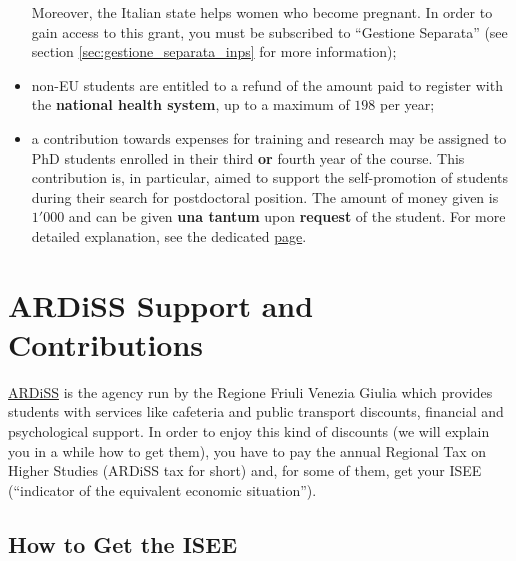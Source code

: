 \documentclass{sissavademecum}
\begin{document}
\begin{itemize}
    Moreover, the Italian state helps women who become pregnant. In order to gain access to this grant, you must be subscribed to ``Gestione Separata'' (see section \ref{sec:gestione_separata_inps} for more information);
    \item non-EU students are entitled to a refund of the amount paid to register with the \textbf{national health system}, up to a maximum of \EUR{} $198$ per year;
    \item a contribution towards expenses for training and research may be assigned to PhD students enrolled in their third \textbf{or} fourth year of the course. This contribution is, in particular, aimed to support the self-promotion of students during their search for postdoctoral position. The amount of money given is \EUR{} $1'000$ and can be given \textbf{una tantum} upon \textbf{request} of the student. For more detailed explanation, see the dedicated \href{https://wiki.sissa.it/students/index.php/Training_and_research_contribution}{page}.
\end{itemize}


\chapter{ARDiSS Support and Contributions}
\label{sec:ARDiSS}


\href{http://www.ardiss.fvg.it}{ARDiSS} is the agency run by the Regione Friuli Venezia Giulia which provides students with services like cafeteria and public transport discounts, financial and psychological support. In order to enjoy this kind of discounts (we will explain you in a while how to get them), you have to pay the annual Regional Tax on Higher Studies (ARDiSS tax for short) and, for some of them, get your ISEE (``indicator of the equivalent economic situation'').

\section{How to Get the ISEE}
\end{document}
